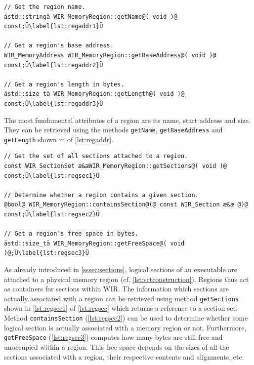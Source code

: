 \begin{lstlisting}[style=code,float=ht,caption={Name, Address and Size Handling of Class \texttt{WIR\_MemoryRegion}},label=lst:regaddr]
// Get the region name.
ästd::stringä WIR_MemoryRegion::getName@( void )@ const;Ü\label{lst:regaddr1}Ü

// Get a region's base address.
WIR_MemoryAddress WIR_MemoryRegion::getBaseAddress@( void )@ const;Ü\label{lst:regaddr2}Ü

// Get a region's length in bytes.
ästd::size_tä WIR_MemoryRegion::getLength@( void )@ const;Ü\label{lst:regaddr3}Ü
\end{lstlisting}

The most fundamental attributes of a region are its name, start address and size.
They can be retrieved using the methods \texttt{getName}, \texttt{getBaseAddress} and \texttt{getLength} shown in  of \cref{lst:regaddr}.

\begin{lstlisting}[style=code,float=!b,caption={Section Handling of Class \texttt{WIR\_MemoryRegion}},label=lst:regsec]
// Get the set of all sections attached to a region.
const WIR_SectionSet æ&æWIR_MemoryRegion::getSections@( void )@ const;Ü\label{lst:regsec1}Ü

// Determine whether a region contains a given section.
@bool@ WIR_MemoryRegion::containsSection@(@ const WIR_Section æ&æ @)@ const;Ü\label{lst:regsec2}Ü

// Get a region's free space in bytes.
ästd::size_tä WIR_MemoryRegion::getFreeSpace@( void )@;Ü\label{lst:regsec3}Ü
\end{lstlisting}

As already introduced in \cref{sssec:sections}, logical sections of an executable are attached to a physical memory region (cf. \cref{lst:sctconstruction}).
Regions thus act as containers for sections within \gls{WIR}.
The information which sections are actually associated with a region can be retrieved using method \texttt{getSections} shown in \cref{lst:regsec1} of \cref{lst:regsec} which returns a reference to a section set.
Method \texttt{containsSection} (\cref{lst:regsec2}) can be used to determine whether some logical section is actually associated with a memory region or not.
Furthermore, \texttt{getFreeSpace} (\cref{lst:regsec3}) computes how many bytes are still free and unoccupied within a region.
This free space depends on the sizes of all the sections associated with a region, their respective contents and alignments, etc.

